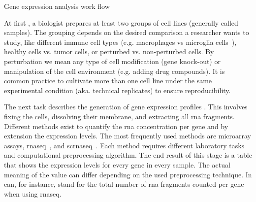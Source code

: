 \documentclass{thesisclass}
\newcommand*\tikzCircled[1]{
	\node[shape=circle,draw,inner sep=2pt, fill=black] (char) {
		\textcolor{white}{#1}
	}
}
\newcommand*\circled[1]{
	\tikz[baseline=(char.base)]{
		\tikzCircled{#1};
	}
}
\begin{document}
\begin{centeredFigure}[!ht]
{%
	}
		
	\caption{Gene expression analysis work flow}
	\label{fig:gene_expression_analysiss}
\end{centeredFigure}

At first \circled{1}, a biologist prepares at least two groups of cell lines (generally called samples). The grouping depends on the desired comparison a researcher wants to study, like different immune cell types (e.g. macrophages vs microglia cells~\cite{10.3389/fncel.2013.00045}), healthy cells vs. tumor cells, or perturbed vs. non-perturbed cells. By perturbation we mean any type of cell modification (gene knock-out) or manipulation of the cell environment (e.g. adding drug compounds). It is common practice to cultivate more than one cell line under the same experimental condition (aka. technical replicates) to ensure reproducibility.

The next task describes the generation of gene expression profiles \circled{2}. This involves fixing the cells,  dissolving their membrane, and extracting all \acrshort{rna} fragments. Different methods exist to quantify the \acrshort{rna} concentration per gene and by extension the expression levels. The most frequently used methods are microarray assays, \acrfull{rnaseq}~\cite{citeulike:691434}, and \acrfull{scrnaseq}~\cite{Eberwine2013}. Each method requires different laboratory tasks and computational preprocessing algorithm. The end result of this stage is a table that shows the expression levels for every gene in every sample. The actual meaning of the value can differ depending on the used preprocessing technique. In can, for instance, stand for the total number of \acrshort{rna} fragments counted per gene when using \acrshort{rnaseq}.
\end{document}
